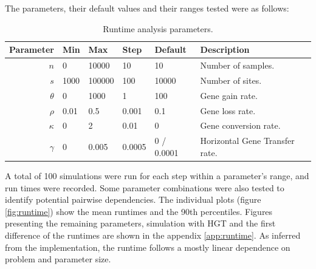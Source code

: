 The parameters, their default values and their ranges tested were as follows:
\begin{table}[h]
    \begin{adjustbox}{width=\textwidth}
        \begin{tabular}{r|lllll}
            Parameter & Min  & Max    & Step   & Default    & Description                    \\
            \hline
            $n$       & 0    & 10000  & 10     & 10         & Number of samples.             \\
            $s$       & 1000 & 100000 & 100    & 10000      & Number of sites.               \\
            $\theta$  & 0    & 1000   & 1      & 100        & Gene gain rate.                \\
            $\rho$    & 0.01 & 0.5    & 0.001  & 0.1        & Gene loss rate.                \\
            $\kappa$  & 0    & 2      & 0.01   & 0          & Gene conversion rate.          \\
            \hline
            $\gamma$  & 0    & 0.005  & 0.0005 & 0 / 0.0001 & Horizontal Gene Transfer rate.
        \end{tabular}
    \end{adjustbox}
    \caption{Runtime analysis parameters.}
\end{table}

A total of 100 simulations were run for each step within a parameter's range, and run times were recorded.
Some parameter combinations were also tested to identify potential pairwise dependencies.
The individual plots (figure \ref{fig:runtime}) show the mean runtimes and the 90th percentiles.
Figures presenting the remaining parameters, simulation with HGT and the first difference of the runtimes are shown in the appendix \ref{app:runtime}.
As inferred from the implementation, the runtime follows a mostly linear dependence on problem and parameter size.

